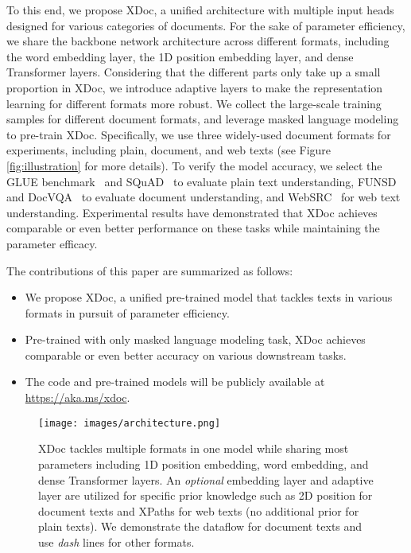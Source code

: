 \documentclass[11pt]{article}
\begin{document}
To this end, we propose XDoc, a unified architecture with multiple input heads designed for various categories of documents. For the sake of parameter efficiency, we share the backbone network architecture across different formats, including the word embedding layer, the 1D position embedding layer, and dense Transformer layers. Considering that the different parts only take up a small proportion in XDoc, we introduce adaptive layers to make the representation learning for different formats more robust. We collect the large-scale training samples for different document formats, and leverage masked language modeling to pre-train XDoc. Specifically, we use three widely-used document formats for experiments, including plain, document, and web texts (see Figure \ref{fig:illustration} for more details). To verify the model accuracy, we select the GLUE benchmark~\citep{wang2018glue} and SQuAD~\cite{rajpurkar2016squad,rajpurkar2018know} to evaluate plain text understanding, FUNSD~\cite{jaume2019funsd} and DocVQA~\cite{mathew2021docvqa} to evaluate document understanding, and WebSRC~\cite{chen2021websrc} for web text understanding. Experimental results have demonstrated that XDoc achieves comparable or even better performance on these tasks while maintaining the parameter efficacy.

The contributions of this paper are summarized as follows:

\begin{itemize}
    \item We propose XDoc, a unified pre-trained model that tackles texts in various formats in pursuit of parameter efficiency.
    \item Pre-trained with only masked language modeling task, XDoc achieves comparable or even better accuracy on various downstream tasks.
    \item The code and pre-trained models will be publicly available at \url{https://aka.ms/xdoc}.
\end{itemize}

\begin{figure*}[t]
    \centering
    \texttt{[image: images/architecture.png]}
    \caption{XDoc tackles multiple formats in one model while sharing most parameters including 1D position embedding, word embedding, and dense Transformer layers. An \textit{optional} embedding layer and adaptive layer are utilized for specific prior knowledge such as 2D position for document texts and XPaths for web texts (no additional prior for plain texts). We demonstrate the dataflow for document texts and use \textit{dash} lines for other formats.}
    \label{fig:architecture}
\end{figure*}
\end{document}
